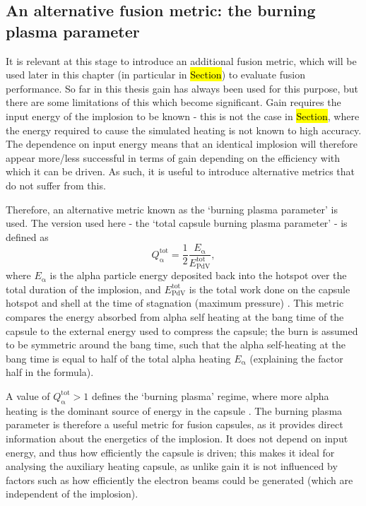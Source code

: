 \subsection{An alternative fusion metric: the burning plasma parameter}
It is relevant at this stage to introduce an additional fusion metric, which will be used later in this chapter (in particular in \hl{Section}) to evaluate fusion performance. So far in this thesis gain has always been used for this purpose, but there are some limitations of this which become significant. Gain requires the input energy of the implosion to be known - this is not the case in \hl{Section}, where the energy required to cause the simulated heating is not known to high accuracy. The dependence on input energy means that an identical implosion will therefore appear more/less successful in terms of gain depending on the efficiency with which it can be driven. As such, it is useful to introduce alternative metrics that do not suffer from this.

Therefore, an alternative metric known as the `burning plasma parameter' is used. The version used here - the `total capsule burning plasma parameter' - is defined as 
\begin{equation} Q^\mathrm{{tot}}_{\mathrm{\alpha}} = \frac{1}{2} \frac{E_\mathrm{\alpha}}{ E^\mathrm{{tot}}_{\mathrm{PdV}}}, \label{eqn:Qtot defn} \end{equation} where $E_\mathrm{\alpha}$ is the alpha particle energy deposited back into the hotspot over the total duration of the implosion, and $E^\mathrm{{tot}}_{\mathrm{PdV}}$ is the total work done on the capsule hotspot and shell at the time of stagnation (maximum pressure) \cite{Betti2015}. This metric compares the energy absorbed from alpha self heating at the bang time of the capsule to the external energy used to compress the capsule; the burn is assumed to be symmetric around the bang time, such that the alpha self-heating at the bang time is equal to half of the total alpha heating $E_\mathrm{\alpha}$ (explaining the factor half in the formula). 

A value of $Q^\mathrm{{tot}}_{\mathrm{\alpha}} > 1$ defines the `burning plasma' regime, where more alpha heating is the dominant source of energy in the capsule \cite{Christopherson2020}. The burning plasma parameter is therefore a useful metric for fusion capsules, as it provides direct information about the energetics of the implosion. It does not depend on input energy, and thus how efficiently the capsule is driven; this makes it ideal for analysing the auxiliary heating capsule, as unlike gain it is not influenced by factors such as how efficiently the electron beams could be generated (which are independent of the implosion).

